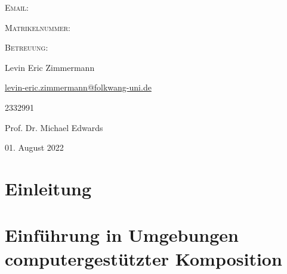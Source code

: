 \documentclass[12pt,a4paper,ngerman]{article}
\newcommand{\mailto}[1]{\href{mailto:#1}{#1}}
\begin{document}
\begin{titlepage}
\begin{minipage}[b]{.25\textwidth}
\begin{flushleft}
\textsc{Email:}

\textsc{Matrikelnummer:}

\textsc{Betreuung:}
\end{flushleft}
\end{minipage}%
\begin{minipage}[b]{.5\textwidth}
\begin{flushleft}
Levin Eric Zimmermann %

{\normalsize \mailto{levin-eric.zimmermann@folkwang-uni.de}}

2332991

Prof. Dr. Michael Edwards
\end{flushleft}
\end{minipage}

\vspace{2cm}



{\large 01. August 2022}\\[2cm] %

\vfill %

\end{titlepage}

\newpage


\tableofcontents


\newpage


\section{Einleitung}


\section{Einführung in Umgebungen computergestützter Komposition}
\end{document}
